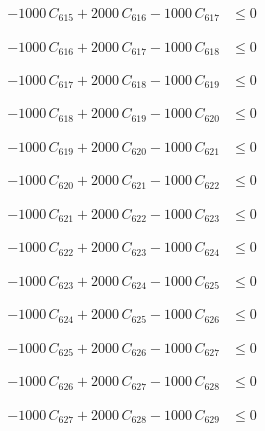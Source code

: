 \documentclass[a4paper,11pt]{article}
\begin{document}
\begin{align}
-1000\,C_{615} + 2000\,C_{616} - 1000\,C_{617} &\leq 0 \nonumber
\end{align}

\begin{align}
-1000\,C_{616} + 2000\,C_{617} - 1000\,C_{618} &\leq 0 \nonumber
\end{align}

\begin{align}
-1000\,C_{617} + 2000\,C_{618} - 1000\,C_{619} &\leq 0 \nonumber
\end{align}

\begin{align}
-1000\,C_{618} + 2000\,C_{619} - 1000\,C_{620} &\leq 0 \nonumber
\end{align}

\begin{align}
-1000\,C_{619} + 2000\,C_{620} - 1000\,C_{621} &\leq 0 \nonumber
\end{align}

\begin{align}
-1000\,C_{620} + 2000\,C_{621} - 1000\,C_{622} &\leq 0 \nonumber
\end{align}

\begin{align}
-1000\,C_{621} + 2000\,C_{622} - 1000\,C_{623} &\leq 0 \nonumber
\end{align}

\begin{align}
-1000\,C_{622} + 2000\,C_{623} - 1000\,C_{624} &\leq 0 \nonumber
\end{align}

\begin{align}
-1000\,C_{623} + 2000\,C_{624} - 1000\,C_{625} &\leq 0 \nonumber
\end{align}

\begin{align}
-1000\,C_{624} + 2000\,C_{625} - 1000\,C_{626} &\leq 0 \nonumber
\end{align}

\begin{align}
-1000\,C_{625} + 2000\,C_{626} - 1000\,C_{627} &\leq 0 \nonumber
\end{align}

\begin{align}
-1000\,C_{626} + 2000\,C_{627} - 1000\,C_{628} &\leq 0 \nonumber
\end{align}

\begin{align}
-1000\,C_{627} + 2000\,C_{628} - 1000\,C_{629} &\leq 0 \nonumber
\end{align}
\end{document}
